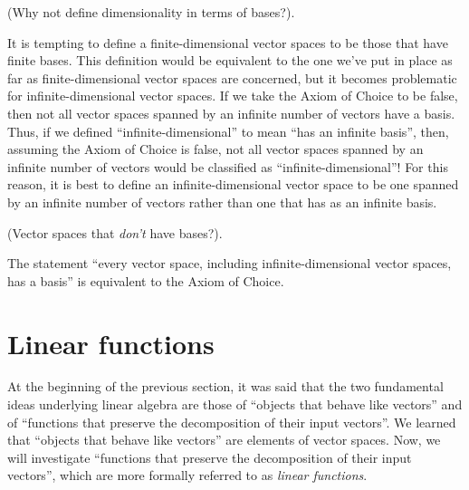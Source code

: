 \begin{remark}
    (Why not define dimensionality in terms of bases?). 
    
    It is tempting to define a finite-dimensional vector spaces to be those that have finite bases. This definition would be equivalent to the one we've put in place as far as finite-dimensional vector spaces are concerned, but it becomes problematic for infinite-dimensional vector spaces. If we take the Axiom of Choice to be false, then not all vector spaces spanned by an infinite number of vectors have a basis. Thus, if we defined ``infinite-dimensional'' to mean ``has an infinite basis'', then, assuming the Axiom of Choice is false, not all vector spaces spanned by an infinite number of vectors would be classified as ``infinite-dimensional''! For this reason, it is best to define an infinite-dimensional vector space to be one spanned by an infinite number of vectors rather than one that has as an infinite basis.
\end{remark}

\begin{remark}
    (Vector spaces that \textit{don't} have bases?).
    
    The statement ``every vector space, including infinite-dimensional vector spaces, has a basis'' is equivalent to the Axiom of Choice.
\end{remark}

\newpage

\section{Linear functions}

At the beginning of the previous section, it was said that the two fundamental ideas underlying linear algebra are those of ``objects that behave like vectors'' and of ``functions that preserve the decomposition of their input vectors''. We learned that ``objects that behave like vectors'' are elements of vector spaces. Now, we will investigate ``functions that preserve the decomposition of their input vectors'', which are more formally referred to as \textit{linear functions}.

